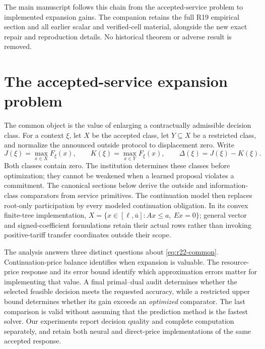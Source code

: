 \documentclass[11pt,letterpaper]{article}
\theoremstyle{definition}
\newcommand{\1}{\mathbf 1}
\begin{document}
The main manuscript follows this chain from the accepted-service problem to implemented expansion gains. The companion retains the full R19 empirical section and all earlier scalar and verified-cell material, alongside the new exact repair and reproduction details. No historical theorem or adverse result is removed.

\section{The accepted-service expansion problem}\label{sec:r22-early}
The common object is the value of enlarging a contractually admissible decision class. For a context $\xi$, let $X$ be the accepted class, let $Y\subseteq X$ be a restricted class, and normalize the announced outside protocol to displacement zero. Write
\begin{equation}\label{eq:r22-common}
 J(\xi)=\max_{x\in X}F_\xi(x),\qquad
 K(\xi)=\max_{x\in Y}F_\xi(x),\qquad
 \Delta(\xi)=J(\xi)-K(\xi).
\end{equation}
Both classes contain zero. The institution determines these classes before optimization; they cannot be weakened when a learned proposal violates a commitment. The canonical sections below derive the outside and information-class comparators from service primitives. The continuation model then replaces root-only participation by every modeled continuation obligation. In its convex finite-tree implementation,
$X=\{x\in[\ell,\bar u]:Ax\leq a,\ Ex=0\}$; general vector and signed-coefficient formulations retain their actual rows rather than invoking positive-tariff transfer coordinates outside their scope.

The analysis answers three distinct questions about \eqref{eq:r22-common}. Continuation-price balance identifies when expansion is valuable. The resource-price response and its error bound identify which approximation errors matter for implementing that value. A final primal--dual audit determines whether the selected feasible decision meets the requested accuracy, while a restricted upper bound determines whether its gain exceeds an \emph{optimized} comparator. The last comparison is valid without assuming that the prediction method is the fastest solver. Our experiments report decision quality and complete computation separately, and retain both neural and direct-price implementations of the same accepted response.

\end{document}
